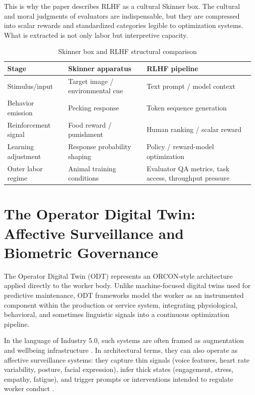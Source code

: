 \documentclass[11pt, a4paper]{article}
\begin{document}
This is why the paper describes RLHF as a cultural Skinner box. The cultural and moral judgments of evaluators are indispensable, but they are compressed into scalar rewards and standardized categories legible to optimization systems. What is extracted is not only labor but interpretive capacity.

\begin{table}[h]
\centering
\caption{Skinner box and RLHF structural comparison}
\begin{tabular}{p{}p{}p{}}
\toprule
\textbf{Stage} & \textbf{Skinner apparatus} & \textbf{RLHF pipeline} \\
\midrule
Stimulus/input & Target image / environmental cue & Text prompt / model context \\
Behavior emission & Pecking response & Token sequence generation \\
Reinforcement signal & Food reward / punishment & Human ranking / scalar reward \\
Learning adjustment & Response probability shaping & Policy / reward-model optimization \\
Outer labor regime & Animal training conditions & Evaluator QA metrics, task access, throughput pressure \\
\bottomrule
\end{tabular}
\end{table}

\section{The Operator Digital Twin: Affective Surveillance and Biometric Governance}

The Operator Digital Twin (ODT) represents an ORCON-style architecture applied directly to the worker body. Unlike machine-focused digital twins used for predictive maintenance, ODT frameworks model the worker as an instrumented component within the production or service system, integrating physiological, behavioral, and sometimes linguistic signals into a continuous optimization pipeline.

In the language of Industry 5.0, such systems are often framed as augmentation and wellbeing infrastructure \cite{breque2021industry}. In architectural terms, they can also operate as affective surveillance systems: they capture thin signals (voice features, heart rate variability, posture, facial expression), infer thick states (engagement, stress, empathy, fatigue), and trigger prompts or interventions intended to regulate worker conduct \cite{delagarza2019time,cogito2023businesswire,kellogg2020algorithms}.
\end{document}
